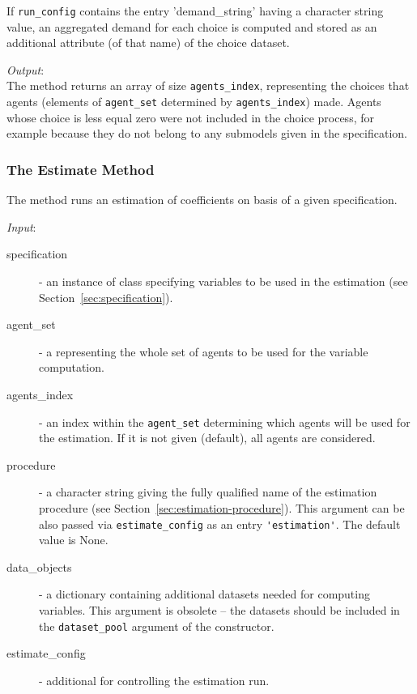 If \verb|run_config| contains the entry 'demand_string' having a character string value, 
an aggregated demand for each choice is computed and stored as an additional attribute (of that name)
of the choice dataset.

{\it Output}:~\\[1mm]
The method returns an array of size \verb|agents_index|, representing the
choices that agents (elements of \verb|agent_set| determined by
\verb|agents_index|) made. Agents whose choice is less equal zero  were
not included in the choice process, for example because they do not belong to
any submodels given in the specification.

\subsubsection{The Estimate Method}
%
The  method runs an estimation of coefficients on basis of
a given specification.

{\it Input}:
\begin{description}
\item[specification] - an instance of class 
  specifying variables to be used in the estimation (see Section~\ref{sec:specification}).
\item[agent_set] - a  representing the whole set of agents
  to be used for the variable computation.
\item[agents_index] - an index within the \verb|agent_set| determining which
  agents will be used for the estimation. If it is not given (default), all agents are
  considered.
\item[procedure] - a character string giving the fully qualified name of the
  estimation procedure (see Section~\ref{sec:estimation-procedure}). This argument can be also passed via
  \verb|estimate_config| as an entry \verb|'estimation'|. The default value is None.
\item[data_objects] - a dictionary containing additional datasets 
  needed for computing variables. This argument is obsolete -- the datasets should be 
  included in the \verb|dataset_pool| argument of the constructor.
\item[estimate_config] - additional  for controlling the
  estimation run.
\end{description}

